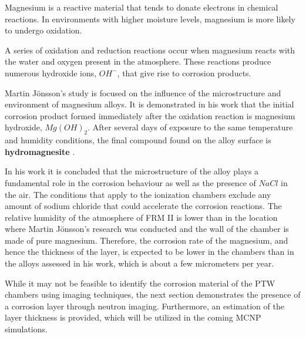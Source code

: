 Magnesium is a reactive material that tends to donate electrons in chemical reactions. In environments with higher moisture levels, magnesium is more likely to undergo oxidation. %

A series of oxidation and reduction reactions occur when magnesium reacts with the water and oxygen present in the atmosphere. These reactions produce numerous hydroxide ions, $OH^{-}$, that give rise to corrosion products. %

Martin Jönsson's study is focused on the influence of the microstructure and environment of magnesium alloys. It is demonstrated in his work that the initial corrosion product formed immediately after the oxidation reaction is magnesium hydroxide, $Mg(OH)_2$. 
After several days of exposure to the same temperature and humidity conditions, the final compound found on the alloy surface is \textbf{hydromagnesite} \cite{AtmosphericCorrosionMgAlloys}.

In his work it is concluded that the microstructure of the alloy plays a fundamental role in the corrosion behaviour as well as the presence of $NaCl$ in the air. The conditions that apply to the ionization chambers exclude any amount of sodium chloride that could accelerate the corrosion reactions. The relative humidity of the atmosphere of FRM II is lower than in the location where Martin Jönsson's research was conducted and the wall of the chamber is made of pure magnesium. Therefore, the corrosion rate of the magnesium, and hence the thickness of the layer, is expected to be lower in the chambers than in the alloys assessed in his work, which is about a few micrometers per year.

While it may not be feasible to identify the corrosion material of the PTW chambers using imaging techniques, the next section demonstrates the presence of a corrosion layer through neutron imaging. Furthermore, an estimation  of the layer thickness is provided, which will be utilized in the coming MCNP simulations.